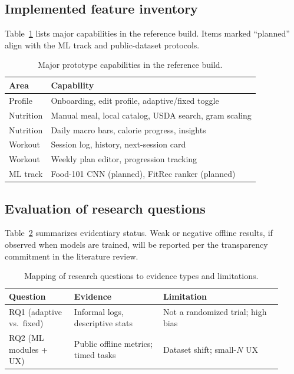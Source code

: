 \documentclass[conference]{IEEEtran}
\begin{document}
\subsection{Implemented feature inventory}
Table~\ref{tab:features} lists major capabilities in the reference build. Items marked ``planned'' align with the ML track and public-dataset protocols.

\begin{table}[htbp]
\caption{Major prototype capabilities in the reference build.}
\label{tab:features}
\begin{center}
\begin{tabular}{|l|l|}
\hline
\textbf{Area} & \textbf{Capability} \\
\hline
Profile & Onboarding, edit profile, adaptive/fixed toggle \\
\hline
Nutrition & Manual meal, local catalog, USDA search, gram scaling \\
\hline
Nutrition & Daily macro bars, calorie progress, insights \\
\hline
Workout & Session log, history, next-session card \\
\hline
Workout & Weekly plan editor, progression tracking \\
\hline
ML track & Food-101 CNN (planned), FitRec ranker (planned) \\
\hline
\end{tabular}
\end{center}
\end{table}

\subsection{Evaluation of research questions}
Table~\ref{tab:rq} summarizes evidentiary status. Weak or negative offline results, if observed when models are trained, will be reported per the transparency commitment in the literature review.

\begin{table}[htbp]
\caption{Mapping of research questions to evidence types and limitations.}
\label{tab:rq}
\begin{center}
\begin{tabular}{|p{0.22\linewidth}|p{0.30\linewidth}|p{0.40\linewidth}|}
\hline
\textbf{Question} & \textbf{Evidence} & \textbf{Limitation} \\
\hline
RQ1 (adaptive vs.\ fixed) & Informal logs, descriptive stats & Not a randomized trial; high bias \\
\hline
RQ2 (ML modules + UX) & Public offline metrics; timed tasks & Dataset shift; small-$N$ UX \\
\hline
\end{tabular}
\end{center}
\end{table}
\end{document}
